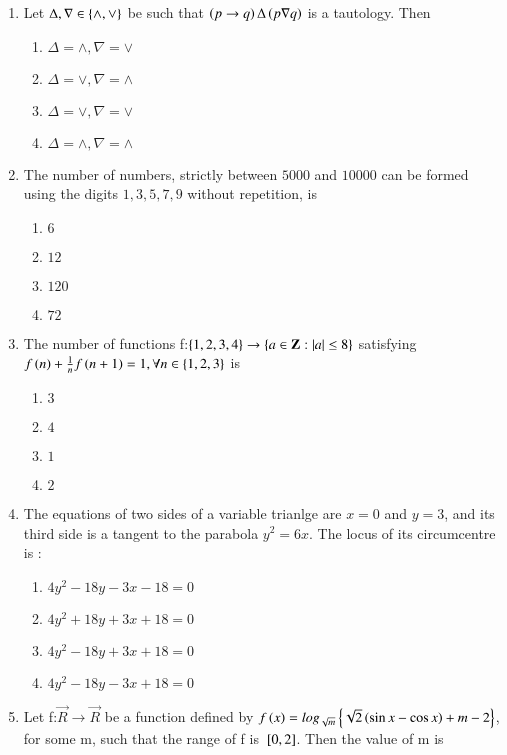 \documentclass[journal,12pt,onecolumn]{IEEEtran}
\theoremstyle{remark}
\begin{document}
\begin{enumerate}
\begin{enumerate}
    \end{enumerate}
    \item Let $\Delta,\nabla \in \left\{\wedge,\vee\right\}$ be such that $\left(p \to q\right)\Delta\left(p\nabla q\right)$ is a tautology. Then 
    \begin{enumerate}
        \item $\Delta=\wedge,\nabla=\vee$
        \item $\Delta=\vee,\nabla=\wedge$
        \item $\Delta=\vee,\nabla=\vee$
        \item $\Delta=\wedge,\nabla=\wedge$
    \end{enumerate}
    \item The number of numbers, strictly between $5000$ and $10000$ can be formed using the digits $1,3,5,7,9$ without repetition, is
    \begin{enumerate}
        \item $6$
        \item $12$
        \item $120$
        \item $72$
    \end{enumerate}
    \item The number of functions f:$\left\{1,2,3,4\right\} \to \left\{a \in \mathbf{Z}:\left\vert a\right\vert\leq8\right\}$ satisfying $f\left(n\right)+\frac{1}{n}f\left(n+1\right)=1,\forall n \in \left\{1,2,3\right\}$ is 
    \begin{enumerate}
        \item $3$
        \item $4$
        \item $1$
        \item $2$
    \end{enumerate}
    \item The equations of two sides of a variable trianlge are $x=0$ and $y=3$, and its third side is a tangent to the parabola $y^2=6x$. The locus of its circumcentre is :
    \begin{enumerate}
        \item $4y^2-18y-3x-18=0$
        \item $4y^2+18y+3x+18=0$
        \item $4y^2-18y+3x+18=0$
        \item $4y^2-18y-3x+18=0$
    \end{enumerate}
    \item Let f:$\vec{R} \to \vec{R}$ be a function defined by $f\left(x\right)=log_{\sqrt{m}}\left\{\sqrt{2}\left(\sin x-\cos x\right)+m-2\right\}$, for some m, such that the range of f is ${}\left[0,2\right]$. Then the value of m is

\end{enumerate}
\end{document}
